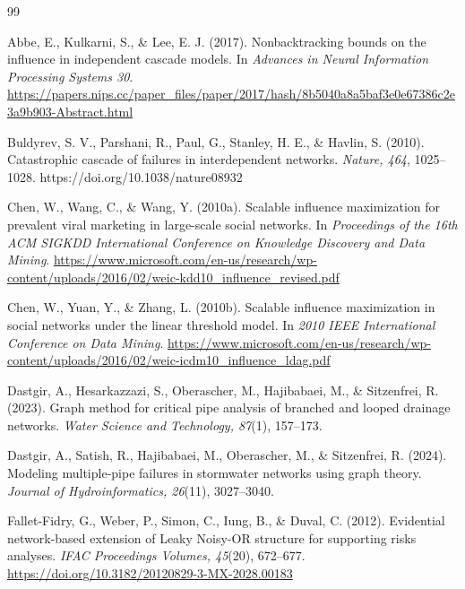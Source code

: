 \renewcommand{\refname}{REFERENCES}
\setlength{\bibsep}{0.5\baselineskip}
\setlength{\bibhang}{1.25cm}

\begin{thebibliography}{99}

Abbe, E., Kulkarni, S., \& Lee, E. J. (2017). Nonbacktracking bounds on the influence in independent cascade models. In \textit{Advances in Neural Information Processing Systems 30}. \url{https://papers.nips.cc/paper_files/paper/2017/hash/8b5040a8a5baf3e0e67386c2e3a9b903-Abstract.html}

Buldyrev, S. V., Parshani, R., Paul, G., Stanley, H. E., \& Havlin, S. (2010). Catastrophic cascade of failures in interdependent networks. \textit{Nature, 464}, 1025--1028. https://doi.org/10.1038/nature08932

Chen, W., Wang, C., \& Wang, Y. (2010a). Scalable influence maximization for prevalent viral marketing in large-scale social networks. In \textit{Proceedings of the 16th ACM SIGKDD International Conference on Knowledge Discovery and Data Mining}. \url{https://www.microsoft.com/en-us/research/wp-content/uploads/2016/02/weic-kdd10_influence_revised.pdf}

Chen, W., Yuan, Y., \& Zhang, L. (2010b). Scalable influence maximization in social networks under the linear threshold model. In \textit{2010 IEEE International Conference on Data Mining}. \url{https://www.microsoft.com/en-us/research/wp-content/uploads/2016/02/weic-icdm10_influence_ldag.pdf}

Dastgir, A., Hesarkazzazi, S., Oberascher, M., Hajibabaei, M., \& Sitzenfrei, R. (2023). Graph method for critical pipe analysis of branched and looped drainage networks. \textit{Water Science and Technology, 87}(1), 157--173.

Dastgir, A., Satish, R., Hajibabaei, M., Oberascher, M., \& Sitzenfrei, R. (2024). Modeling multiple-pipe failures in stormwater networks using graph theory. \textit{Journal of Hydroinformatics, 26}(11), 3027--3040.

Fallet-Fidry, G., Weber, P., Simon, C., Iung, B., \& Duval, C. (2012). Evidential network-based extension of Leaky Noisy-OR structure for supporting risks analyses. \textit{IFAC Proceedings Volumes, 45}(20), 672--677. \url{https://doi.org/10.3182/20120829-3-MX-2028.00183}


\end{thebibliography}
